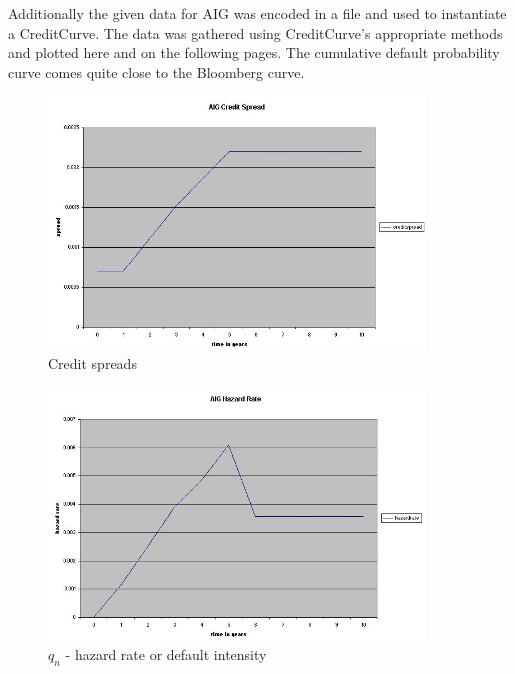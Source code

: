 Additionally the given data for AIG was encoded in a file and used
to instantiate a CreditCurve.  The data was gathered using
CreditCurve's appropriate methods and plotted here and on the
following pages. The cumulative default probability curve comes
quite close to the Bloomberg curve.

\begin{figure}
\begin{center}
        \includegraphics[width=10cm]{creditcurve-spread.jpg}
        \caption{Credit spreads}
\end{center}
\end{figure}


\begin{figure}
\begin{center}
        \includegraphics[width=10cm]{creditcurve-hazardrate.jpg}
        \caption{$q_{n}$ - hazard rate or default intensity}
\end{center}
\end{figure}


